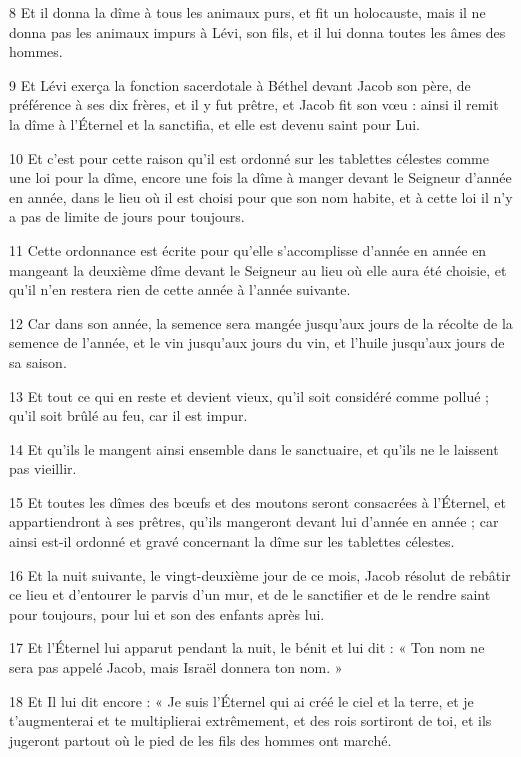 \par 8 Et il donna la dîme à tous les animaux purs, et fit un holocauste, mais il ne donna pas les animaux impurs à Lévi, son fils, et il lui donna toutes les âmes des hommes.
\par 9 Et Lévi exerça la fonction sacerdotale à Béthel devant Jacob son père, de préférence à ses dix frères, et il y fut prêtre, et Jacob fit son vœu : ainsi il remit la dîme à l'Éternel et la sanctifia, et elle est devenu saint pour Lui.
\par 10 Et c'est pour cette raison qu'il est ordonné sur les tablettes célestes comme une loi pour la dîme, encore une fois la dîme à manger devant le Seigneur d'année en année, dans le lieu où il est choisi pour que son nom habite, et à cette loi il n'y a pas de limite de jours pour toujours.
\par 11 Cette ordonnance est écrite pour qu'elle s'accomplisse d'année en année en mangeant la deuxième dîme devant le Seigneur au lieu où elle aura été choisie, et qu'il n'en restera rien de cette année à l'année suivante.
\par 12 Car dans son année, la semence sera mangée jusqu'aux jours de la récolte de la semence de l'année, et le vin jusqu'aux jours du vin, et l'huile jusqu'aux jours de sa saison.
\par 13 Et tout ce qui en reste et devient vieux, qu'il soit considéré comme pollué ; qu'il soit brûlé au feu, car il est impur.
\par 14 Et qu'ils le mangent ainsi ensemble dans le sanctuaire, et qu'ils ne le laissent pas vieillir.
\par 15 Et toutes les dîmes des bœufs et des moutons seront consacrées à l'Éternel, et appartiendront à ses prêtres, qu'ils mangeront devant lui d'année en année ; car ainsi est-il ordonné et gravé concernant la dîme sur les tablettes célestes.
\par 16 Et la nuit suivante, le vingt-deuxième jour de ce mois, Jacob résolut de rebâtir ce lieu et d'entourer le parvis d'un mur, et de le sanctifier et de le rendre saint pour toujours, pour lui et son des enfants après lui.
\par 17 Et l'Éternel lui apparut pendant la nuit, le bénit et lui dit : « Ton nom ne sera pas appelé Jacob, mais Israël donnera ton nom. »
\par 18 Et Il lui dit encore : « Je suis l'Éternel qui ai créé le ciel et la terre, et je t'augmenterai et te multiplierai extrêmement, et des rois sortiront de toi, et ils jugeront partout où le pied de les fils des hommes ont marché.
